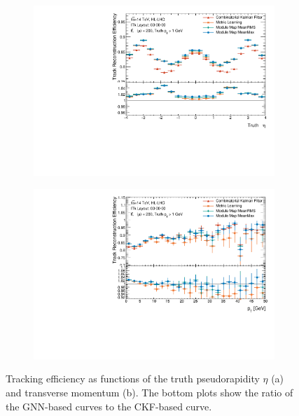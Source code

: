 \begin{figure}[h!]
\centering
\begin{subfigure}{0.65\textwidth}
    \centering
    \includegraphics[width=\textwidth]{figures/ckf-gnn/Efficiency/efficiency_vs_eta.pdf}
    \caption{}
    \label{subfig:tracking-eff-eta}
\end{subfigure} 
\begin{subfigure}{0.65\textwidth}
    \centering
    \includegraphics[width=\textwidth]{figures/ckf-gnn/Efficiency/efficiency_vs_pt.pdf}
    \caption{}
    \label{subfig:tracking-eff-pt}
\end{subfigure}
\caption{Tracking efficiency as functions of the truth pseudorapidity $\eta$ (a) and transverse momentum \pT (b). The bottom plots show the ratio of the GNN-based curves to the CKF-based curve.}
\label{fig:tracking-eff}
\end{figure}

